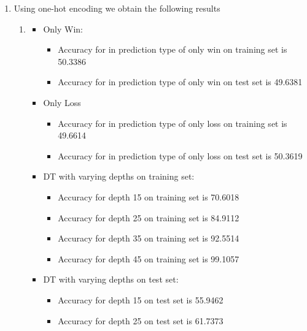\begin{enumerate}[label=(\alph*)]
    \item Using one-hot encoding we obtain the following results

          \begin{enumerate}[label=\roman*.]
              \item
                    \begin{itemize}
                        \item Only Win:
                              \begin{itemize}
                                  \item Accuracy for in prediction type of only win on training set is 50.3386
                                  \item Accuracy for in prediction type of only win on test set is 49.6381
                              \end{itemize}
                        \item Only Loss
                              \begin{itemize}
                                  \item Accuracy for in prediction type of only loss on training set is 49.6614
                                  \item Accuracy for in prediction type of only loss on test set is 50.3619
                              \end{itemize}
                        \item DT with varying depths on training set:
                              \begin{itemize}
                                  \item Accuracy for depth 15 on training set is 70.6018
                                  \item Accuracy for depth 25 on training set is 84.9112
                                  \item Accuracy for depth 35 on training set is 92.5514
                                  \item Accuracy for depth 45 on training set is 99.1057
                              \end{itemize}
                        \item DT with varying depths on test set:
                              \begin{itemize}
                                  \item Accuracy for depth 15 on test set is 55.9462
                                  \item Accuracy for depth 25 on test set is 61.7373

\end{itemize}
\end{itemize}
\end{enumerate}
\end{enumerate}
